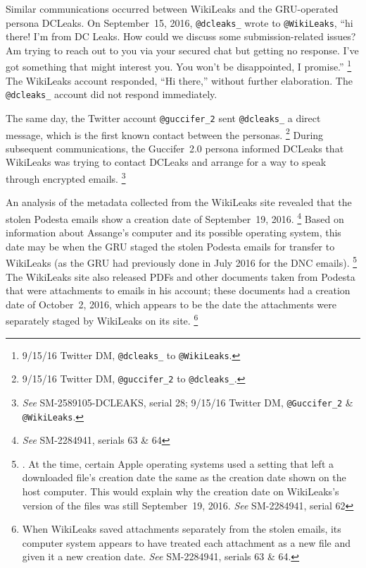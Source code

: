 Similar communications occurred between WikiLeaks and the GRU-operated persona DCLeaks.
On September~15, 2016, \verb+@dcleaks_+ wrote to \verb+@WikiLeaks+, ``hi there!
I'm from DC Leaks.
How could we discuss some submission-related issues?
Am trying to reach out to you via your secured chat but getting no response.
I've got something that might interest you.
You won't be disappointed, I promise.''%
\footnote{9/15/16 Twitter DM, \verb+@dcleaks_+ to \verb+@WikiLeaks+.}
The WikiLeaks account responded, ``Hi there,'' without further elaboration.
The \verb+@dcleaks_+ account did not respond immediately.

The same day, the Twitter account \verb+@guccifer_2+ sent \verb+@dcleaks_+ a direct message, which is the first known contact between the personas.%
\footnote{9/15/16 Twitter DM, \verb+@guccifer_2+ to \verb+@dcleaks_+.}
During subsequent communications, the Guccifer~2.0 persona informed DCLeaks that WikiLeaks was trying to contact DCLeaks and arrange for a way to speak through encrypted emails.%
\footnote{\textit{See} SM-2589105-DCLEAKS, serial 28;
9/15/16 Twitter DM, \verb+@Guccifer_2+ \& \verb+@WikiLeaks+.}

An analysis of the metadata collected from the WikiLeaks site revealed that the stolen Podesta emails show a  creation date of September~19, 2016.%
\footnote{\textit{See} SM-2284941, serials 63 \& 64 }
Based on information about Assange's computer and its possible operating system, this date may be when the GRU staged the stolen Podesta emails for transfer to WikiLeaks (as the GRU had previously done in July 2016 for the DNC emails).%
\footnote{. At the time, certain Apple operating systems used a setting that left a downloaded file's creation date the same as the creation date shown on the host computer.
This would explain why the creation date on WikiLeaks's version of the files was still September~19, 2016.
\textit{See} SM-2284941, serial 62 }
The WikiLeaks site also released PDFs and other documents taken from Podesta that were attachments to emails in his account; these documents had a creation date of October~2, 2016, which appears to be the date the attachments were separately staged by WikiLeaks on its site.%
\footnote{When WikiLeaks saved attachments separately from the stolen emails, its computer system appears to have treated each attachment as a new file and given it a new creation date.
\textit{See} SM-2284941, serials 63 \& 64.}

